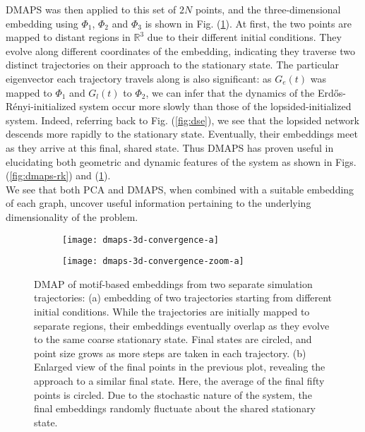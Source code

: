 \documentclass[epjST, final]{svjour}
\begin{document}
\begin{onehalfspace}
DMAPS was then applied to this set of $2N$ points, and the
three-dimensional embedding using $\Phi_1$, $\Phi_2$ and $\Phi_3$ is
shown in Fig. (\ref{fig:dmaps-results}). At first, the two points are
mapped to distant regions in $\mathbb{R}^3$ due to their different
initial conditions. They evolve along different coordinates of
the embedding, indicating they traverse two distinct trajectories on
their approach to the stationary state. The particular eigenvector
each trajectory travels along is also significant: as $G_e(t)$ was
mapped to $\Phi_1$ and $G_l(t)$ to $\Phi_2$, we can infer that the
dynamics of the Erd\H{o}s-R\'{e}nyi-initialized system occur more
slowly than those of the lopsided-initialized system. Indeed,
referring back to Fig. (\ref{fig:dse}), we see that the lopsided
network descends more rapidly to the stationary state. Eventually,
their embeddings meet as they arrive at this final, shared state. Thus
DMAPS has proven useful in elucidating both geometric and dynamic
features of the system as shown in Figs. (\ref{fig:dmaps-rk}) and (\ref{fig:dmaps-results}). \\

We see that both PCA and DMAPS, when combined with a suitable
embedding of each graph, uncover useful information pertaining to the
underlying dimensionality of the problem.


\begin{figure}[h!]
  \vspace{-5mm}
  \centering
  \begin{subfigure}{0.49\textwidth}
    \centering
    \texttt{[image: dmaps-3d-convergence-a]}
    \subcaption{\label{fig:dmaps-results-regular}}
  \end{subfigure} %
  \begin{subfigure}{0.49\textwidth}
    \centering
    \texttt{[image: dmaps-3d-convergence-zoom-a]}
    \subcaption{\label{fig:dmaps-results-zoom}}
  \end{subfigure}%
  \caption{DMAP of motif-based embeddings from two separate simulation
    trajectories: (a) embedding of two trajectories starting from
    different initial conditions. While the trajectories are initially
    mapped to separate regions, their embeddings eventually overlap as
    they evolve to the same coarse stationary state. Final states are
    circled, and point size grows as more steps are taken in each
    trajectory. (b) Enlarged view of the final points in the previous
    plot, revealing the approach to a similar final state. Here, the
    average of the final fifty points is circled. Due to the
    stochastic nature of the system, the final embeddings randomly
    fluctuate about the shared stationary
    state. \label{fig:dmaps-results}}
\end{figure}


\end{onehalfspace}
\end{document}
